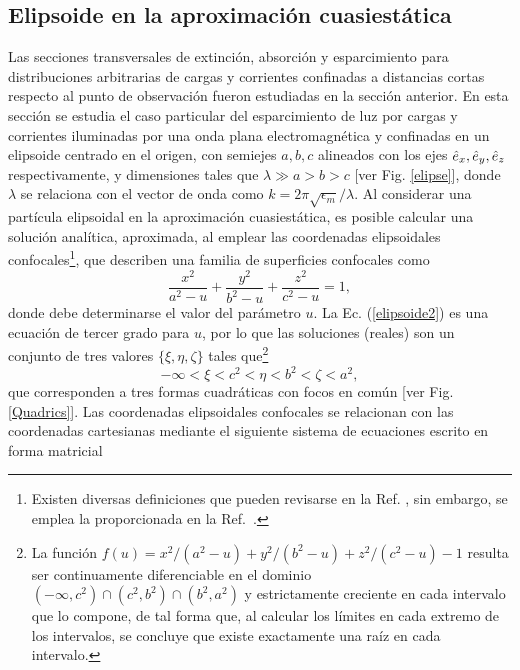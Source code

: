 \hypertarget{elipsoide}{\subsection{Elipsoide en la aproximación cuasiestática}}
Las secciones transversales de extinción, absorción y esparcimiento para distribuciones arbitrarias de cargas y corrientes confinadas a distancias cortas respecto al punto de observación fueron estudiadas en la sección anterior. En esta sección se estudia el caso particular del esparcimiento de luz por cargas y corrientes iluminadas por una onda plana electromagnética y confinadas en un elipsoide centrado en el origen, con semiejes $a,b,c$ alineados con los ejes $\hat{e}_{x},\hat{e}_{y},\hat{e}_{z}$ respectivamente, y dimensiones tales que $\lambda\gg a>b>c$ [ver Fig. \ref{elipse}], donde $\lambda$ se relaciona con el vector de onda como $k=2\pi\sqrt{\epsilon_m}/\lambda$. Al considerar una partícula elipsoidal en la aproximación cuasiestática, es posible calcular una solución analítica, aproximada, al emplear las coordenadas elipsoidales confocales\footnote{Existen diversas definiciones que pueden revisarse en la Ref. \cite{ConfocalEllip}, sin embargo, se emplea la proporcionada en la Ref.~\cite{Arfken}. }, que describen una familia de superficies confocales como \cite{ConfocalEllip}
\begin{equation}
	\frac{x^2}{a^2-u}+\frac{y^2}{b^2-u}+\frac{z^2}{c^2-u}=1,
	\label{elipsoide2}
\end{equation}
 donde debe determinarse el valor del parámetro $u$. La Ec. (\ref{elipsoide2}) es una ecuación de tercer grado para $u$, por lo que las soluciones (reales) son un conjunto de tres valores $\{\xi,\eta,\zeta\}$ tales que\footnote{La función $f(u)=x^2/(a^2-u)+y^2/(b^2-u)+z^2/(c^2-u)-1$ resulta ser continuamente diferenciable en el dominio $(-\infty, c^2)\cap (c^2, b^2)\cap (b^2, a^2)$ y estrictamente creciente en cada intervalo que lo compone, de tal forma que, al calcular los límites en cada extremo de los intervalos, se concluye que existe exactamente una raíz en cada intervalo.}
\begin{equation}
	-\infty<\xi<c^2<\eta<b^2<\zeta<a^2,
\end{equation}
que corresponden a tres formas cuadráticas con focos en común [ver Fig. \ref{Quadrics}]. Las coordenadas elipsoidales confocales se relacionan con las coordenadas cartesianas mediante el siguiente sistema de ecuaciones escrito en forma matricial
%
